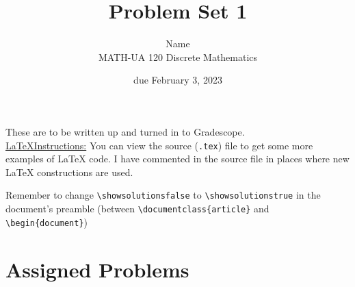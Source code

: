 \documentclass{article}
\title{Problem Set 1}
\author{%
    Name
\\  MATH-UA 120 Discrete Mathematics
}
\date{due February 3, 2023}
\newif\ifshowsolutions
\newcommand{\danger}{\marginpar[\hfill\dbend]{\dbend\hfill}}
\theoremstyle{definition}
\begin{document}
\maketitle



These are to be written up and turned in to Gradescope.\\



\ifshowsolutions
    \SetupExSheets{solution/print=true}
\else
    \danger
 \underline{ \LaTeX  Instructions:}  You can view the source (\texttt{.tex}) file to get some more examples of \LaTeX{} code.  I have commented in the source file in places where new \LaTeX{} constructions are used.
  
  Remember to change \verb|\showsolutionsfalse| to \verb|\showsolutionstrue|
    in the document's preamble 
    (between \verb|\documentclass{article}| and \verb|\begin{document}|)
\fi

\section*{Assigned Problems}
\end{document}
